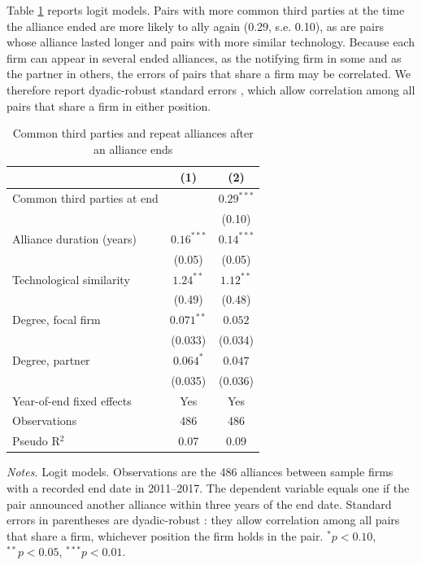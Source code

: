 \documentclass[12pt]{article}
\begin{document}
Table \ref{tab:persist} reports logit models. Pairs with more common third parties at the time the alliance ended are more likely to ally again (0.29, s.e. 0.10), as are pairs whose alliance lasted longer and pairs with more similar technology. Because each firm can appear in several ended alliances, as the notifying firm in some and as the partner in others, the errors of pairs that share a firm may be correlated. We therefore report dyadic-robust standard errors \citep{aronow2015}, which allow correlation among all pairs that share a firm in either position.

\begin{table}[!htbp]
\centering
\begin{threeparttable}
\caption{Common third parties and repeat alliances after an alliance ends}
\label{tab:persist}
\small
\begin{tabular}{lcc}
\toprule
 & (1) & (2) \\
\midrule
Common third parties at end & & $0.29^{***}$ \\
 & & (0.10) \\
Alliance duration (years) & $0.16^{***}$ & $0.14^{***}$ \\
 & (0.05) & (0.05) \\
Technological similarity & $1.24^{**}$ & $1.12^{**}$ \\
 & (0.49) & (0.48) \\
Degree, focal firm & $0.071^{**}$ & $0.052$ \\
 & (0.033) & (0.034) \\
Degree, partner & $0.064^{*}$ & $0.047$ \\
 & (0.035) & (0.036) \\
\midrule
Year-of-end fixed effects & Yes & Yes \\
Observations & 486 & 486 \\
Pseudo R$^2$ & 0.07 & 0.09 \\
\bottomrule
\end{tabular}
\begin{tablenotes}
\footnotesize
\item \textit{Notes.} Logit models. Observations are the 486 alliances between sample firms with a recorded end date in 2011--2017. The dependent variable equals one if the pair announced another alliance within three years of the end date. Standard errors in parentheses are dyadic-robust \citep{aronow2015}: they allow correlation among all pairs that share a firm, whichever position the firm holds in the pair. $^{*}p<0.10$, $^{**}p<0.05$, $^{***}p<0.01$.
\end{tablenotes}
\end{threeparttable}
\end{table}
\end{document}

